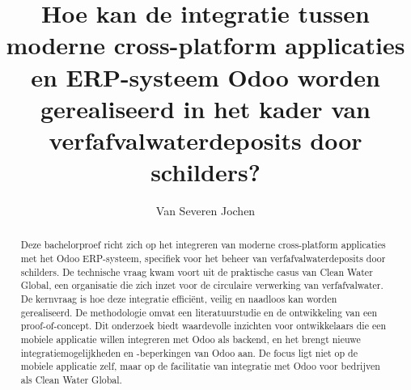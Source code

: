 \documentclass{hogent-article}
\title{Hoe kan de integratie tussen moderne cross-platform applicaties en ERP-systeem Odoo worden gerealiseerd in het kader van verfafvalwaterdeposits door schilders?}
\author{Van Severen Jochen}
\begin{document}

\begin{abstract}
  Deze bachelorproef richt zich op het integreren van moderne cross-platform applicaties met het Odoo ERP-systeem, specifiek voor het beheer van verfafvalwaterdeposits door schilders. 
  De technische vraag kwam voort uit de praktische casus van Clean Water Global, een organisatie die zich inzet voor de circulaire verwerking van verfafvalwater. 
  De kernvraag is hoe deze integratie efficiënt, veilig en naadloos kan worden gerealiseerd. 
  De methodologie omvat een literatuurstudie en de ontwikkeling van een proof-of-concept. 
  Dit onderzoek biedt waardevolle inzichten voor ontwikkelaars die een mobiele applicatie willen integreren met Odoo als backend, en het brengt nieuwe integratiemogelijkheden en -beperkingen van Odoo aan. 
  De focus ligt niet op de mobiele applicatie zelf, maar op de facilitatie van integratie met Odoo voor bedrijven als Clean Water Global.
\end{abstract}
\tableofcontents



\printbibliography[heading=bibintoc]
\end{document}

